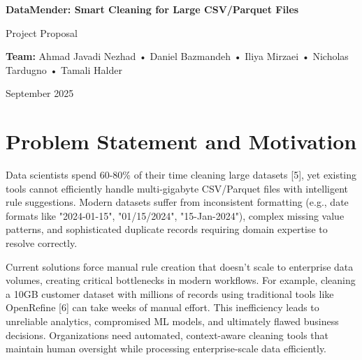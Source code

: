 \documentclass[11pt]{article}
\begin{document}
\begin{center}
    {\LARGE\color{primaryblue}\textbf{DataMender: Smart Cleaning for Large CSV/Parquet Files}}
    
    \vspace{0.2cm}
    {\large\color{darkgray}Project Proposal}
    
    \vspace{0.3cm}
    
    \vspace{0.3cm}
    {\color{darkgray}\textbf{Team:}} Ahmad Javadi Nezhad • Daniel Bazmandeh • Iliya Mirzaei • Nicholas Tardugno • Tamali Halder
    
    \vspace{0.2cm}
    {\color{darkgray}September 2025}
\end{center}

\vspace{0.3cm}

\section{\color{primaryblue}Problem Statement and Motivation}

Data scientists spend 60-80\% of their time cleaning large datasets [5], yet existing tools cannot efficiently handle multi-gigabyte CSV/Parquet files with intelligent rule suggestions. Modern datasets suffer from inconsistent formatting (e.g., date formats like "2024-01-15", "01/15/2024", "15-Jan-2024"), complex missing value patterns, and sophisticated duplicate records requiring domain expertise to resolve correctly.

Current solutions force manual rule creation that doesn't scale to enterprise data volumes, creating critical bottlenecks in modern workflows. For example, cleaning a 10GB customer dataset with millions of records using traditional tools like OpenRefine [6] can take weeks of manual effort. This inefficiency leads to unreliable analytics, compromised ML models, and ultimately flawed business decisions. Organizations need automated, context-aware cleaning tools that maintain human oversight while processing enterprise-scale data efficiently.
\end{document}
